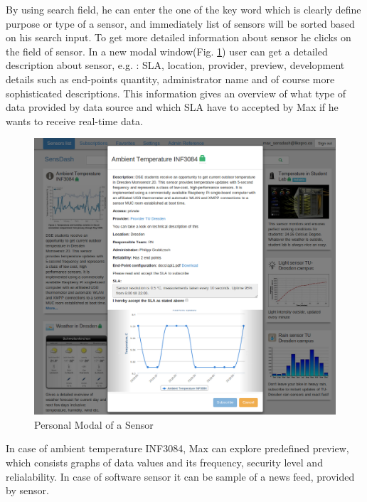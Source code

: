 By using search field, he can enter the one of the key word which is clearly define purpose or type of a sensor, and immediately list of sensors will be sorted based on his search input. To get more detailed information about sensor he clicks on the field of sensor. In a new modal window(Fig. \ref{img:modal}) user can get a detailed description about sensor, e.g. : SLA, location, provider, preview, development details such as end-points quantity, administrator name and of course more sophisticated descriptions. This information gives an overview of what type of data provided by data source and which SLA have to accepted by Max if he wants to receive real-time data. 
\begin{figure}[!ht]
\centering
\includegraphics[scale=0.6]{Screenshots/UseCaseWelcome.png}   
\caption[Personal Modal of a Sensor]{Personal Modal of a Sensor}
\label{img:modal}                       
\end{figure}
 
 In case of ambient temperature INF3084, Max can explore predefined preview, which consists graphs of data values and its frequency, security level and relialability. In case of software sensor it can be sample of a news feed, provided by sensor. 

